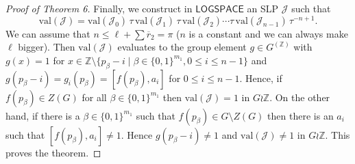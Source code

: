 \documentclass[10pt,a4paper]{article}
\newcommand{\Z}{\ensuremath{\mathbb Z}}
\newcommand{\val}{\mathrm{val}}
\renewcommand{\L}{\ensuremath{\mathsf{LOGSPACE}}\xspace}
\begin{document}
\begin{proof}[Proof of Theorem 6]
Finally, we construct in \L an SLP $\mathcal{J}$ such that 
\[ 
\val(\mathcal{J}) = \val(\mathcal{J}_0)\, \tau \,\val(\mathcal{J}_1) \,\tau\, \val(\mathcal{J}_2) \cdots \tau \, \val(\mathcal{J}_{n-1}) \,\tau^{-n+1} .
\]
We can assume that $n \leq \ell+\sum \overline{r}_2 = \pi$ ($n$ is a constant and we can always make $\ell$ bigger).
Then $\val(\mathcal{J})$ evaluates to the group element $g \in G^{(\Z)}$ with $g(x) = 1$ for 
$x \in \mathbb{Z} \setminus \{ p_\beta - i \mid \beta \in \{0,1\}^{m_1}, 0 \leq i \leq n-1 \}$ and
$g(p_\beta - i) = g_i(p_\beta) = [f(p_\beta),a_i]$ for $0 \leq i \leq n-1$.
Hence, if $f(p_{\beta}) \in Z(G)$ for all $\beta \in \{0,1\}^{m_1}$ then 
$\val(\mathcal{J})=1$ in $G \wr \Z$. On the other hand, if there is a $\beta \in \{0,1\}^{m_1}$ such that
$f(p_{\beta}) \in G \setminus Z(G)$ then there is an $a_i$ such that 
$[f(p_\beta),a_i] \neq 1$. Hence $g(p_\beta - i) \neq 1$ and 
$\val(\mathcal{J})\neq 1$ in $G \wr \Z$. 
This proves the theorem.
\end{proof}
\end{document}
